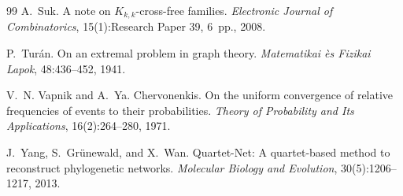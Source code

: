 \documentclass[11pt]{article}
\begin{document}
\begin{thebibliography}{99}
		A.~Suk.
		A note on $K_{k,k}$-cross-free families.
		\emph{Electronic Journal of Combinatorics}, 15(1):Research Paper 39, 6~pp., 2008.
		
		P.~Tur\'an.
		On an extremal problem in graph theory.
		\emph{Matematikai \`es Fizikai Lapok}, 48:436--452, 1941.
		
		V.~N. Vapnik and A.~Ya. Chervonenkis.
		On the uniform convergence of relative frequencies of events to their probabilities.
		\emph{Theory of Probability and Its Applications}, 16(2):264--280, 1971.
		
		J.~Yang, S.~Gr\"unewald, and X.~Wan.
		Quartet-Net: A quartet-based method to reconstruct phylogenetic networks.
		\emph{Molecular Biology and Evolution}, 30(5):1206--1217, 2013.
		
	\end{thebibliography}
	
\end{document}

